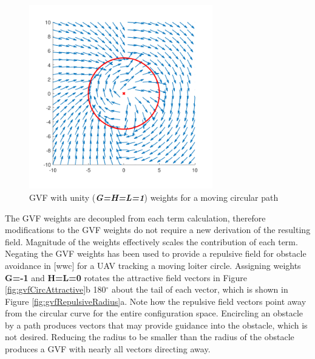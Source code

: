 \documentclass[numbered,pdftex]{ohio-etd}
\begin{document}
\begin{figure}
	\centering
	\includegraphics[width=8cm]{PaperFigures/compWithoutTitles/circConvCircTv}
	\caption{GVF with unity (\textit{\textbf{G=H=L=1}}) weights for a moving circular path}
	\label{fig:circconvcirctv}
\end{figure}

The GVF weights are decoupled from each term calculation, therefore modifications to the GVF weights do not require a new derivation of the resulting field. Magnitude of the weights effectively scales the contribution of each term. Negating the GVF weights has been used to provide a repulsive field for obstacle avoidance in [wwc] for a UAV tracking a moving loiter circle. Assigning weights \textbf{G=-1} and \textbf{H=L=0} rotates the attractive field vectors in Figure \ref{fig:gvfCircAttractive}b 180$^\circ$ about the tail of each vector, which is shown in Figure \ref{fig:gvfRepulsiveRadius}a. Note how the repulsive field vectors point away from the circular curve for the entire configuration space. Encircling an obstacle by a path produces vectors that may provide guidance into the obstacle, which is not desired. Reducing the radius to be smaller than the radius of the obstacle produces a GVF with nearly all vectors directing away. 
\end{document}
